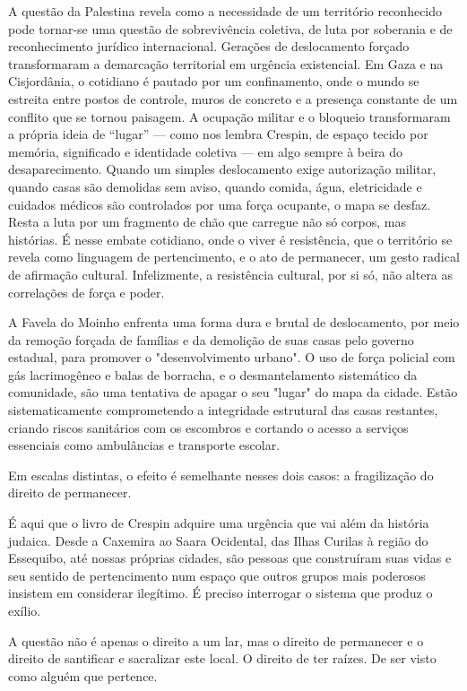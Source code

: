 A questão da Palestina revela como a necessidade de um território
reconhecido pode tornar-se uma questão de sobrevivência coletiva, de
luta por soberania e de reconhecimento jurídico internacional. Gerações
de deslocamento forçado transformaram a demarcação territorial em
urgência existencial. Em Gaza e na Cisjordânia, o cotidiano é pautado
por um confinamento, onde o mundo se estreita entre postos de controle,
muros de concreto e a presença constante de um conflito que se tornou
paisagem. A ocupação militar e o bloqueio transformaram a própria ideia
de ``lugar'' --- como nos lembra Crespin, de espaço tecido por memória,
significado e identidade coletiva --- em algo sempre à beira do
desaparecimento. Quando um simples deslocamento exige autorização
militar, quando casas são demolidas sem aviso, quando comida, água,
eletricidade e cuidados médicos são controlados por uma força ocupante,
o mapa se desfaz. Resta a luta por um fragmento de chão que carregue não
só corpos, mas histórias. É nesse embate cotidiano, onde o viver é
resistência, que o território se revela como linguagem de pertencimento,
e o ato de permanecer, um gesto radical de afirmação cultural.
Infelizmente, a resistência cultural, por si só, não altera as
correlações de força e poder.

A Favela do Moinho enfrenta uma forma dura e brutal de deslocamento, por
meio da remoção forçada de famílias e da demolição de suas casas pelo
governo estadual, para promover o "desenvolvimento urbano". O uso de
força policial com gás lacrimogêneo e balas de borracha, e o
desmantelamento sistemático da comunidade, são uma tentativa de apagar o
seu "lugar" do mapa da cidade. Estão sistematicamente comprometendo a
integridade estrutural das casas restantes, criando riscos sanitários
com os escombros e cortando o acesso a serviços essenciais como
ambulâncias e transporte escolar.

Em escalas distintas, o efeito é semelhante nesses dois casos: a
fragilização do direito de permanecer.

É aqui que o livro de Crespin adquire uma urgência que vai além da
história judaica. Desde a Caxemira ao Saara Ocidental, das Ilhas Curilas
à região do Essequibo, até nossas próprias cidades, são pessoas que
construíram suas vidas e seu sentido de pertencimento num espaço que
outros grupos mais poderosos insistem em considerar ilegítimo. É preciso
interrogar o sistema que produz o exílio.

A questão não é apenas o direito a um lar, mas o direito de permanecer e
o direito de santificar e sacralizar este local. O direito de ter
raízes. De ser visto como alguém que pertence.

